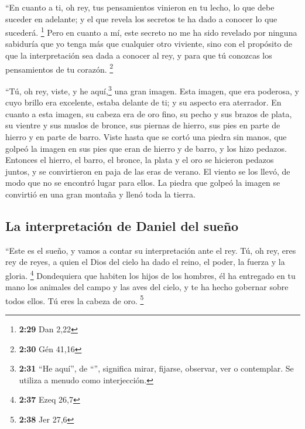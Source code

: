 \begin{paracol}{2}
 ``En cuanto a ti, oh rey, tus pensamientos vinieron en
tu lecho, lo que debe suceder en adelante; y el que revela los secretos
te ha dado a conocer lo que sucederá. \footnote{\textbf{2:29} Dan 2,22}
 Pero en cuanto a mí, este secreto no me ha sido revelado
por ninguna sabiduría que yo tenga más que cualquier otro viviente, sino
con el propósito de que la interpretación sea dada a conocer al rey, y
para que tú conozcas los pensamientos de tu corazón. \footnote{\textbf{2:30}
  Gén 41,16}

 ``Tú, oh rey, viste, y he aquí,\footnote{\textbf{2:31}
  ``He aquí'', de ``'', significa mirar, fijarse, observar,
  ver o contemplar. Se utiliza a menudo como interjección.} una gran
imagen. Esta imagen, que era poderosa, y cuyo brillo era excelente,
estaba delante de ti; y su aspecto era aterrador.  En
cuanto a esta imagen, su cabeza era de oro fino, su pecho y sus brazos
de plata, su vientre y sus muslos de bronce,  sus piernas
de hierro, sus pies en parte de hierro y en parte de barro.
 Viste hasta que se cortó una piedra sin manos, que
golpeó la imagen en sus pies que eran de hierro y de barro, y los hizo
pedazos.  Entonces el hierro, el barro, el bronce, la
plata y el oro se hicieron pedazos juntos, y se convirtieron en paja de
las eras de verano. El viento se los llevó, de modo que no se encontró
lugar para ellos. La piedra que golpeó la imagen se convirtió en una
gran montaña y llenó toda la tierra.

\hypertarget{la-interpretaciuxf3n-de-daniel-del-sueuxf1o}{%
\subsection{La interpretación de Daniel del
sueño}\label{la-interpretaciuxf3n-de-daniel-del-sueuxf1o}}

 ``Este es el sueño, y vamos a contar su interpretación
ante el rey.  Tú, oh rey, eres rey de reyes, a quien el
Dios del cielo ha dado el reino, el poder, la fuerza y la gloria.
\footnote{\textbf{2:37} Ezeq 26,7}  Dondequiera que
habiten los hijos de los hombres, él ha entregado en tu mano los
animales del campo y las aves del cielo, y te ha hecho gobernar sobre
todos ellos. Tú eres la cabeza de oro. \footnote{\textbf{2:38} Jer 27,6}


\end{paracol}
